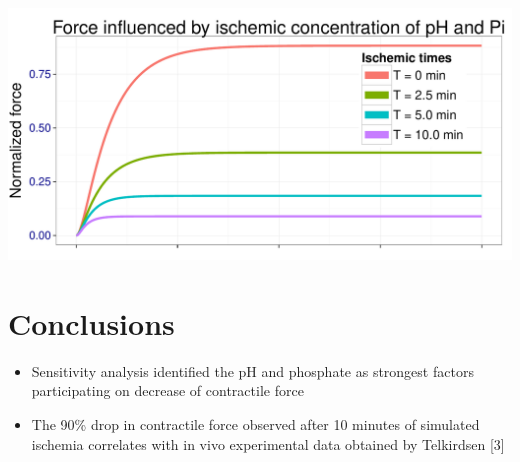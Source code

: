 \documentclass[a0,portrait]{a0poster}
\begin{document}
\begin{multicols}{2}
    
\begin{center}\vspace{1cm}
\includegraphics[scale=1.0]{fig/graf3}
\end{center}\vspace{1cm}




\color{SaddleBrown} %

\section*{Conclusions}

\begin{itemize}

\item Sensitivity analysis identified the pH and phosphate as 
    strongest factors participating on decrease of contractile force

\item The 90\% drop in contractile force observed after 10 minutes of simulated
    ischemia correlates with in vivo experimental data obtained by
    Telkirdsen [3]

\end{itemize}


\color{DarkSlateGray} %


\end{multicols}
\end{document}
